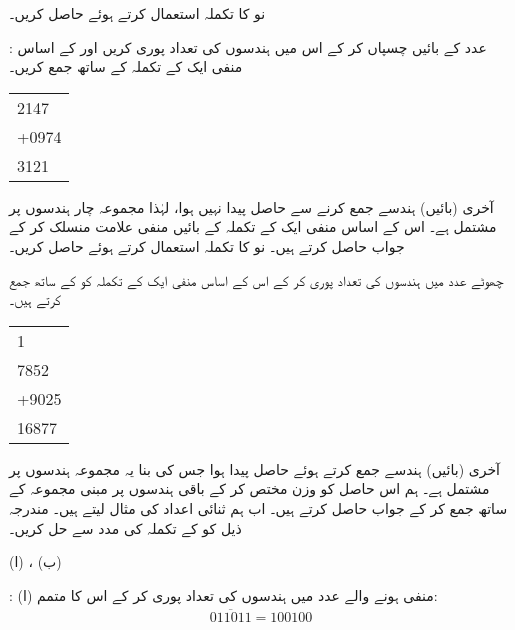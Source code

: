 نو کا تکملہ استعمال کرتے ہوئے  حاصل کریں۔ 

:\quad
 عدد  کے بائیں  چسپاں کر کے اس میں ہندسوں کی تعداد پوری کریں اور  کے اساس منفی ایک کے تکملہ کے ساتھ جمع کریں۔
  \begin{center}
\begin{otherlanguage}{english}
\begin{tabular}{L}
\phantom{+}2147\\
+0974\\
\midrule
\phantom{+}3121
\end{tabular}
\end{otherlanguage}
\end{center}
آخری (بائیں) ہندسے جمع کرنے سے حاصل  پیدا نہیں ہوا، لہٰذا مجموعہ چار ہندسوں پر مشتمل ہے۔ اس کے اساس منفی ایک کے تکملہ  کے بائیں منفی علامت منسلک کر کے جواب  حاصل کرتے ہیں۔
نو کا تکملہ استعمال کرتے ہوئے  حاصل کریں۔ 

\quad
چھوٹے عدد  میں ہندسوں کی تعداد پوری کر کے اس کے اساس منفی ایک کے تکملہ  کو  کے ساتھ جمع کرتے ہیں۔
 \begin{center}
\begin{otherlanguage}{english}
\begin{tabular}{L}
\phantom{1}1\\
\phantom{+}7852\\
+9025\\
\midrule
\phantom{\,}16877
\end{tabular}
\end{otherlanguage}
\end{center}
 آخری (بائیں) ہندسے جمع کرتے ہوئے حاصل  پیدا ہوا جس کی بنا یہ مجموعہ  ہندسوں پر مشتمل ہے۔ ہم اس حاصل  کو وزن  مختص کر کے باقی  ہندسوں پر مبنی مجموعہ  کے ساتھ جمع کر کے جواب  حاصل کرتے ہیں۔
اب ہم ثنائی اعداد کی مثال لیتے ہیں۔
 مندرجہ ذیل کو  کے تکملہ کی مدد سے حل کریں۔

(ا) ، (ب)  

:\quad
 (ا) منفی ہونے والے عدد میں ہندسوں کی تعداد پوری کر کے اس کا متمم:
 \begin{align*}
 \overline{011011}=100100
 \end{align*}

